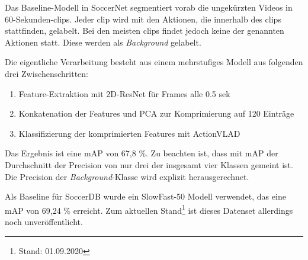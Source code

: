 Das Baseline-Modell in SoccerNet segmentiert vorab die ungekürzten Videos in 60-Sekunden-\glspl{clip}.
Jeder \gls{clip} wird mit den Aktionen, die innerhalb des \glspl{clip} stattfinden, gelabelt.
Bei den meisten \glspl{clip} findet jedoch keine der genannten Aktionen statt.
Diese werden als \emph{Background} gelabelt.

Die eigentliche Verarbeitung besteht aus einem mehrstufiges Modell aus folgenden drei Zwischenschritten:

\begin{enumerate}
    \item Feature-Extraktion mit 2D-ResNet für Frames alle 0.5 sek
    \item Konkatenation der Features und PCA zur Komprimierung auf 120 Einträge
    \item Klassifizierung der komprimierten Features mit ActionVLAD
\end{enumerate}

Das Ergebnis ist eine mAP von 67,8 \%.
Zu beachten ist, dass mit mAP der Durchschnitt der Precision von nur drei der insgesamt vier Klassen gemeint ist.
Die Precision der \emph{Background}-Klasse wird explizit herausgerechnet.

Als Baseline für SoccerDB wurde ein SlowFast-50 Modell verwendet, das eine mAP von 69,24 \% erreicht.
Zum aktuellen Stand\footnote{Stand: 01.09.2020} ist dieses Datenset allerdings noch unveröffentlicht.
